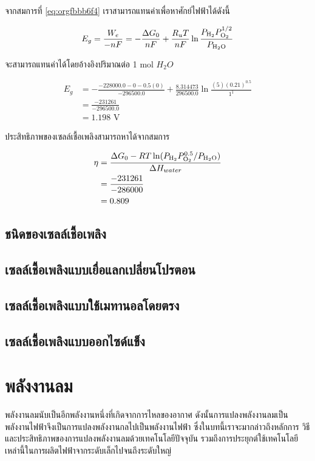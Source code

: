 \documentclass[a4paper,nobib,openany,10pt]{tufte-book}
\begin{document}
จากสมการที่ \ref{eq:orgfbbb6f4}
เราสามารถแทนค่าเพื่อหาศักย์ไฟฟ้าได้ดังนี้

\[E_g = \frac{W_e}{-nF} = -\frac{\Delta G_0}{nF} + \frac{R_u T}{nF} \ln \frac{P_{\ce{H2}} P_{\ce{O2}}^{1/2}}{P_{\ce{H2O}}}\]

จะสามารถแทนค่าได้โดยอ้างอิงปริมาณต่อ 1 mol \(H_2O\)

\begin{align*}
E_g &= - \frac{-228000.0-0- 0.5(0)}{-296500.0} + \frac{8.314473}{296500.0} \ln \frac{(5)(0.21)^{0.5}}{1^1} \\
&= \frac{-231261}{-296500.0} \\
&= 1.198\text{ V}
\end{align*}

ประสิทธิภาพของเซลล์เชื้อเพลิงสามารถหาได้จากสมการ

\begin{align*}
\eta &= \frac{\Delta G_0 - RT \ln (P_{\ce{H_2}} P_{\ce{O2}}^{0.5}/ P_{\ce{H2O}})}{\Delta H_{water}} \\
&= \frac{-231261}{-286000} \\ 
&=0.809\\
\end{align*}

\section{ชนิดของเซลล์เชื้อเพลิง}
\label{sec:org058c36a}
\section{เซลล์เชื้อเพลิงแบบเยื่อแลกเปลี่ยนโปรตอน}
\label{sec:org5df89c4}
\section{เซลล์เชื้อเพลิงแบบใช้เมทานอลโดยตรง}
\label{sec:orgbe1e96c}
\section{เซลล์เชื้อเพลิงแบบออกไซด์แข็ง}
\label{sec:org94cfc0e}
\chapter{พลังงานลม}
\label{sec:org43edcb1}
พลังงานลมนับเป็นอีกพลังงานหนึ่งที่เกิดจากการไหลของอากาศ
ดังนั้นการแปลงพลังงานลมเป็นพลังงานไฟฟ้าจึงเป็นการแปลงพลังงานกลไปเป็นพลังงานไฟฟ้า
ซึ่งในบทนี้เราจะมากล่าวถึงหลักการ วิธี
และประสิทธิภาพของการแปลงพลังงานลมด้วยเทคโนโลยีปัจจุบัน
รวมถึงการประยุกต์ใช้เทคโนโลยีเหล่านี้ในการผลิตไฟฟ้าจากระดับเล็กไปจนถึงระดับใหญ่
\end{document}
